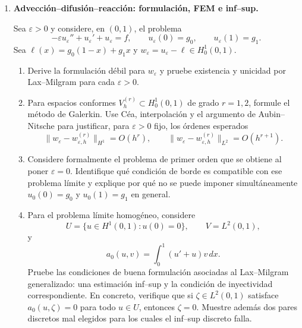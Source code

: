 \documentclass[11pt]{article}
\def\vec   #1{\mbox{\boldmath $#1$}{}}
\begin{document}
\begin{enumerate}[label=\textbf{\arabic*.}, leftmargin=*]
\begin{enumerate}[label=(\alph*), leftmargin=*]
    \item Deduzca una estimaci\'on de estabilidad de la forma
    \begin{equation*}
        \|\vec u\|_{H^1(\Omega)}+\|p\|_{L^2(\Omega)}
        \le C\big(\|\vec f\|_{H^{-1}(\Omega)}+\|\vec v_g\|_{H^1(\Omega)}\big).
    \end{equation*}
\end{enumerate}

\item \textbf{Advecci\'on--difusi\'on--reacci\'on: formulaci\'on, FEM e inf--sup.}

Sea $\varepsilon>0$ y considere, en $(0,1)$, el problema
\begin{equation*}
    -\varepsilon u_\varepsilon''+u_\varepsilon'+u_\varepsilon=f,
    \qquad
    u_\varepsilon(0)=g_0,
    \qquad
    u_\varepsilon(1)=g_1.
\end{equation*}
Sea $\ell(x)=g_0(1-x)+g_1x$ y $w_\varepsilon=u_\varepsilon-\ell\in H^1_0(0,1)$.

\begin{enumerate}[label=(\alph*), leftmargin=*]
    \item Derive la formulaci\'on d\'ebil para $w_\varepsilon$ y pruebe existencia y unicidad por Lax--Milgram para cada $\varepsilon>0$.

    \item Para espacios conformes $V_h^{(r)}\subset H^1_0(0,1)$ de grado $r=1,2$, formule el m\'etodo de Galerkin. Use C\'ea, interpolaci\'on y el argumento de Aubin--Nitsche para justificar, para $\varepsilon>0$ fijo, los \'ordenes esperados
    \begin{equation*}
        \|w_\varepsilon-w_{\varepsilon,h}^{(r)}\|_{H^1}=O(h^r),
        \qquad
        \|w_\varepsilon-w_{\varepsilon,h}^{(r)}\|_{L^2}=O(h^{r+1}).
    \end{equation*}

    \item Considere formalmente el problema de primer orden que se obtiene al poner $\varepsilon=0$. Identifique qu\'e condici\'on de borde es compatible con ese problema l\'imite y explique por qu\'e no se puede imponer simult\'aneamente $u_0(0)=g_0$ y $u_0(1)=g_1$ en general.

    \item Para el problema l\'imite homog\'eneo, considere
    \begin{equation*}
        U=\{u\in H^1(0,1):u(0)=0\},
        \qquad
        V=L^2(0,1),
    \end{equation*}
    y
    \begin{equation*}
        a_0(u,v)=\int_0^1(u'+u)v\,dx.
    \end{equation*}
    Pruebe las condiciones de buena formulaci\'on asociadas al Lax--Milgram generalizado: una estimaci\'on inf--sup y la condici\'on de inyectividad correspondiente. En concreto, verifique que si $\zeta\in L^2(0,1)$ satisface $a_0(u,\zeta)=0$ para todo $u\in U$, entonces $\zeta=0$. Muestre adem\'as dos pares discretos mal elegidos para los cuales el inf--sup discreto falla.


\end{enumerate}
\end{enumerate}
\end{document}
